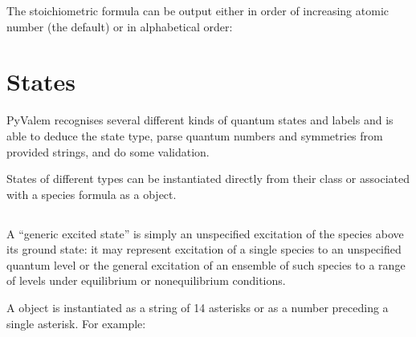 \documentclass[letterpaper,10pt,english]{sphinxmanual}
\begin{document}
The stoichiometric formula can be output either in order of increasing atomic number (the default) or in alphabetical order:

\begin{sphinxVerbatim}[commandchars=\\\{\}]
 \PYG{p}{[}\PYG{p}{]} 

 \PYG{p}{[}\PYG{p}{]} 
\end{sphinxVerbatim}


\chapter{States}
\label{\detokenize{states:states}}\label{\detokenize{states::doc}}
PyValem recognises several different kinds of quantum states and labels and is able to deduce the state type, parse quantum numbers and symmetries from provided strings, and do some validation.

States of different types can be instantiated directly from their class or associated with a species formula as a  object.


\section{}
\label{\detokenize{states:genericexcitedstate}}
A “generic excited state” is simply an unspecified excitation of the species above its ground state: it may represent excitation of a single species to an unspecified quantum level or the general excitation of an ensemble of such species to a range of levels under equilibrium or non\sphinxhyphen{}equilibrium conditions.

A  object is instantiated as a string of 1\sphinxhyphen{}4 asterisks or as a number preceding a single asterisk. For example:
\end{document}
